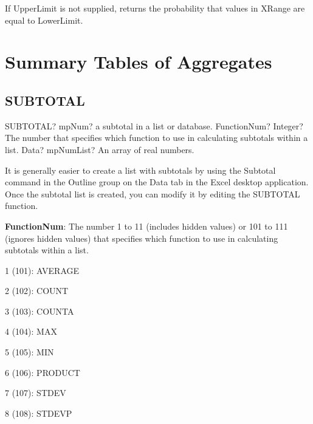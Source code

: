 \vspace{0.3cm}
If \textsf{UpperLimit} is not supplied, returns the probability that values in \textsf{XRange} are equal to \textsf{LowerLimit}.





\newpage
\section{Summary Tables of Aggregates}


\subsection{SUBTOTAL}

\begin{mpFunctionsExtract}
	\mpWorksheetFunctionTwoNotImplemented
	{SUBTOTAL? mpNum? a subtotal in a list or database.}
	{FunctionNum? Integer?  The number that specifies which function to use in calculating subtotals within a list.}
	{Data? mpNumList? An array of real numbers.}
\end{mpFunctionsExtract}


\vspace{0.3cm}
It is generally easier to create a list with subtotals by using the Subtotal command in the Outline group on the Data tab in the Excel desktop application. Once the subtotal list is created, you can modify it by editing the SUBTOTAL function.

\vspace{0.3cm}
\textsf{\textbf{FunctionNum}}: The number 1 to 11 (includes hidden values) or 101 to 111 (ignores hidden values) that specifies which function to use in calculating subtotals within a list.


1 (101): AVERAGE 

2 (102): COUNT 

3 (103): COUNTA 

4 (104): MAX 

5 (105): MIN 

6 (106): PRODUCT 

7 (107): STDEV 

8 (108): STDEVP 

9 (109): SUM 

10 (110): VAR 

11 (111): VARP 





\subsection{AGGREGATE}


